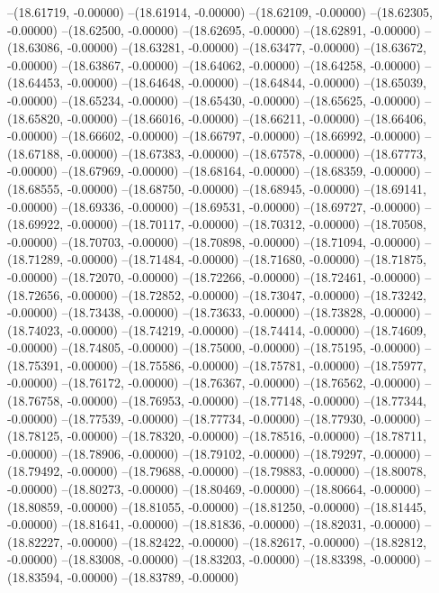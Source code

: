 --(18.61719, -0.00000)
--(18.61914, -0.00000)
--(18.62109, -0.00000)
--(18.62305, -0.00000)
--(18.62500, -0.00000)
--(18.62695, -0.00000)
--(18.62891, -0.00000)
--(18.63086, -0.00000)
--(18.63281, -0.00000)
--(18.63477, -0.00000)
--(18.63672, -0.00000)
--(18.63867, -0.00000)
--(18.64062, -0.00000)
--(18.64258, -0.00000)
--(18.64453, -0.00000)
--(18.64648, -0.00000)
--(18.64844, -0.00000)
--(18.65039, -0.00000)
--(18.65234, -0.00000)
--(18.65430, -0.00000)
--(18.65625, -0.00000)
--(18.65820, -0.00000)
--(18.66016, -0.00000)
--(18.66211, -0.00000)
--(18.66406, -0.00000)
--(18.66602, -0.00000)
--(18.66797, -0.00000)
--(18.66992, -0.00000)
--(18.67188, -0.00000)
--(18.67383, -0.00000)
--(18.67578, -0.00000)
--(18.67773, -0.00000)
--(18.67969, -0.00000)
--(18.68164, -0.00000)
--(18.68359, -0.00000)
--(18.68555, -0.00000)
--(18.68750, -0.00000)
--(18.68945, -0.00000)
--(18.69141, -0.00000)
--(18.69336, -0.00000)
--(18.69531, -0.00000)
--(18.69727, -0.00000)
--(18.69922, -0.00000)
--(18.70117, -0.00000)
--(18.70312, -0.00000)
--(18.70508, -0.00000)
--(18.70703, -0.00000)
--(18.70898, -0.00000)
--(18.71094, -0.00000)
--(18.71289, -0.00000)
--(18.71484, -0.00000)
--(18.71680, -0.00000)
--(18.71875, -0.00000)
--(18.72070, -0.00000)
--(18.72266, -0.00000)
--(18.72461, -0.00000)
--(18.72656, -0.00000)
--(18.72852, -0.00000)
--(18.73047, -0.00000)
--(18.73242, -0.00000)
--(18.73438, -0.00000)
--(18.73633, -0.00000)
--(18.73828, -0.00000)
--(18.74023, -0.00000)
--(18.74219, -0.00000)
--(18.74414, -0.00000)
--(18.74609, -0.00000)
--(18.74805, -0.00000)
--(18.75000, -0.00000)
--(18.75195, -0.00000)
--(18.75391, -0.00000)
--(18.75586, -0.00000)
--(18.75781, -0.00000)
--(18.75977, -0.00000)
--(18.76172, -0.00000)
--(18.76367, -0.00000)
--(18.76562, -0.00000)
--(18.76758, -0.00000)
--(18.76953, -0.00000)
--(18.77148, -0.00000)
--(18.77344, -0.00000)
--(18.77539, -0.00000)
--(18.77734, -0.00000)
--(18.77930, -0.00000)
--(18.78125, -0.00000)
--(18.78320, -0.00000)
--(18.78516, -0.00000)
--(18.78711, -0.00000)
--(18.78906, -0.00000)
--(18.79102, -0.00000)
--(18.79297, -0.00000)
--(18.79492, -0.00000)
--(18.79688, -0.00000)
--(18.79883, -0.00000)
--(18.80078, -0.00000)
--(18.80273, -0.00000)
--(18.80469, -0.00000)
--(18.80664, -0.00000)
--(18.80859, -0.00000)
--(18.81055, -0.00000)
--(18.81250, -0.00000)
--(18.81445, -0.00000)
--(18.81641, -0.00000)
--(18.81836, -0.00000)
--(18.82031, -0.00000)
--(18.82227, -0.00000)
--(18.82422, -0.00000)
--(18.82617, -0.00000)
--(18.82812, -0.00000)
--(18.83008, -0.00000)
--(18.83203, -0.00000)
--(18.83398, -0.00000)
--(18.83594, -0.00000)
--(18.83789, -0.00000)
